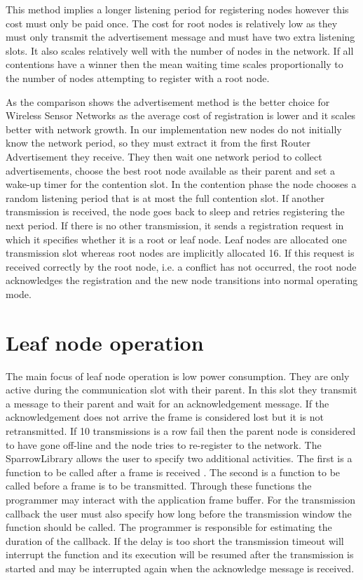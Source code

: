This method implies a longer listening period for registering nodes however
this cost must only be paid once. The cost for root nodes is relatively low as
they must only transmit the advertisement message and must have two extra
listening slots. It also scales relatively well with the number of nodes in the
network.  If all contentions have a winner then the mean waiting time scales
proportionally to the number of nodes attempting to register with a root node. 

\vspace{\baselineskip}

As the comparison shows the advertisement method is the better choice for
Wireless Sensor Networks as the average cost of registration is lower and it
scales better with network growth. In our implementation new nodes do not
initially know the network period, so they must extract it from the first
Router Advertisement they receive. They then wait one network period to collect
advertisements, choose the best root node available as their parent and set a
wake-up timer for the contention slot. In the contention phase the node chooses
a random listening period that is at most the full contention slot. If another
transmission is received, the node goes back to sleep and retries registering
the next period. If there is no other transmission, it sends a registration
request in which it specifies whether it is a root or leaf node.  Leaf nodes
are allocated one transmission slot whereas root nodes are implicitly allocated
16. If this request is received correctly by the root node, i.e. a conflict has
not occurred, the root node acknowledges the registration and the new node
transitions into normal operating mode.

\section{Leaf node operation}
\label{sec:leaf_node_operation}

The main focus of leaf node operation is low power consumption. They are only
active during the communication slot with their parent. In this slot they
transmit a message to their parent and wait for an acknowledgement message. If
the acknowledgement does not arrive the frame is considered lost but it is not
retransmitted. If 10 transmissions is a row fail then the parent node is
considered to have gone off-line and the node tries to re-register to the
network. The SparrowLibrary allows the user to specify two additional
activities. The first is a function to be called after a frame is received .
The second is a function to be called before a frame is to be transmitted.
Through these functions the programmer may interact with the application frame
buffer. For the transmission callback the user must also specify how long
before the transmission window the function should be called. The programmer is
responsible for estimating the duration of the callback. If the delay is too
short the transmission timeout will interrupt the function and its execution
will be resumed after the transmission is started and may be interrupted again
when the acknowledge message is received.


